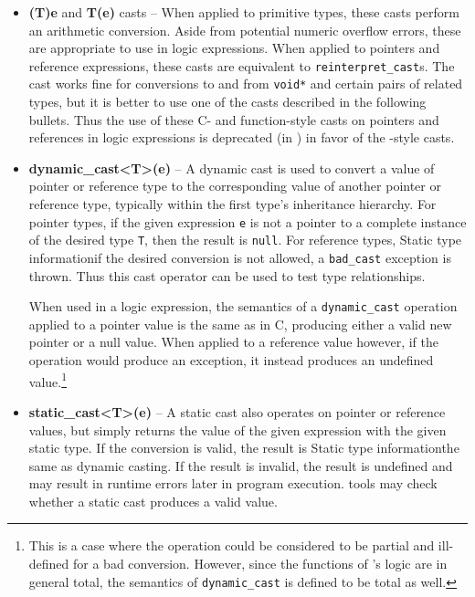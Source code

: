 \begin{itemize}
	\item \textbf{(T)e} and \textbf{T(e)} casts -- When applied to primitive types, these casts perform an arithmetic conversion. Aside from potential numeric overflow errors, these are appropriate to use in logic expressions. When applied to pointers and reference expressions, these casts are equivalent to
	\lstinline|reinterpret_cast|s. The cast works fine for conversions to and from \lstinline|void*| and certain pairs of related types, but it is better to use one of
	the \lang{} casts described in the following bullets.
	Thus the use of these C- and function-style casts on 
	pointers and references in logic expressions is 
	deprecated (in \NAME{}) in favor of the \lang{}-style casts.
	
	\item \textbf{dynamic\_cast<T>(e)} -- A dynamic cast is used to convert a value of pointer or reference type to the corresponding value of another pointer or reference type, typically within the first type's inheritance hierarchy. For pointer types, if the given expression \lstinline|e| is not a pointer to a complete instance of the desired type \lstinline|T|, then the result is \lstinline|null|. For reference types, Static type informationif the desired conversion is not allowed, a \lstinline|bad_cast| exception is thrown. Thus this cast operator can be used to test type relationships.
	
	When used in a logic expression, the semantics of a \lstinline|dynamic_cast| operation applied to a pointer value is the same as in C, producing either a valid new pointer or a null value. When applied to a reference value however, if the operation would produce an exception, it instead produces an undefined value.\footnote{This is a case where the operation could be considered to be partial and ill-defined for a bad conversion. However, since the  functions of \NAME{}'s logic are in general total, the semantics of \lstinline|dynamic_cast| is defined to be total as well.}  
	
	\item \textbf{static\_cast<T>(e)} -- A static cast also operates on pointer or reference values, but simply returns the value of the given expression with the given static type. If the conversion is valid, the result is Static type informationthe same as dynamic casting. If the result is invalid, the result is undefined and may result in runtime errors later in program execution. \NAME{} tools may check whether a static cast produces a valid value.
	

\end{itemize}
